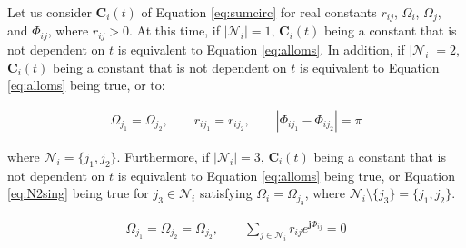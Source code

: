 \documentclass[tombow,dvipdfmx]{corona-a5-1.1}
\begin{document}
\begin{補題}
\label{lem:sumc2}

Let us consider $\bm{C}_i (t)$ of Equation \ref{eq:sumcirc} for real constants $r_{ij}$, $\Omega_i$, $\Omega_j$, and $\Phi_{ij}$, where $r_{ij}>0$.
At this time, if $|\mathcal{N}_i|=1$, $\bm{C}_i (t)$ being a constant that is not dependent on $t$ is equivalent to Equation \ref{eq:alloms}.
In addition, if $|\mathcal{N}_i|=2$, $\bm{C}_i (t)$ being a constant that is not dependent on $t$ is equivalent to Equation \ref{eq:alloms} being true, or to:

\begin{align}\label{eq:N2sing}
\Omega_{j_1} = \Omega_{j_2}
,\qquad
r_{i j_1} = r_{i j_2}
,\qquad
|\Phi_{i j_1}-\Phi_{i j_2}| = \pi
\end{align}

where $\mathcal{N}_i = \{j_1,j_2\}$.
Furthermore, if $|\mathcal{N}_i|=3$, $\bm{C}_i (t)$ being a constant that is not dependent on $t$ is equivalent to Equation \ref{eq:alloms} being true,
or Equation \ref{eq:N2sing} being true for $j_3 \in \mathcal{N}_i$ satisfying $\Omega_{i} = \Omega_{j_3}$, where $ \mathcal{N}_i \setminus \{j_3\}=\{j_1,j_2\}$.

\begin{align}\label{eq:threeoms}
\Omega_{j_1} = \Omega_{j_2}= \Omega_{j_2}
,\qquad 
\sum_{j\in \mathcal{N}_i} 
r_{ij} e^{\bm{j} \Phi_{ij}}=0
\end{align}
\end{補題}
\end{document}
